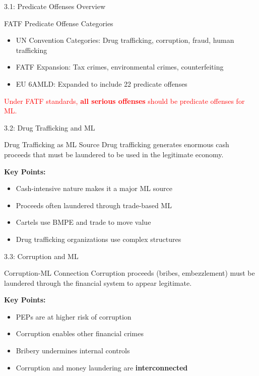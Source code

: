 \documentclass{beamer}
\begin{document}
	
	\begin{frame}{3.1: Predicate Offenses Overview}
		\begin{block}{FATF Predicate Offense Categories}
			\begin{itemize}
				\item UN Convention Categories: Drug trafficking, corruption, fraud, human trafficking
				\item FATF Expansion: Tax crimes, environmental crimes, counterfeiting
				\item EU 6AMLD: Expanded to include 22 predicate offenses
			\end{itemize}
		\end{block}
		\textcolor{red}{Under FATF standards, \textbf{all serious offenses} should be predicate offenses for ML.}
	\end{frame}
	
	\begin{frame}{3.2: Drug Trafficking and ML}
		\begin{block}{Drug Trafficking as ML Source}
			Drug trafficking generates enormous cash proceeds that must be laundered to be used in the legitimate economy.
		\end{block}
		\textbf{Key Points:}
		\begin{itemize}
			\item Cash-intensive nature makes it a major ML source
			\item Proceeds often laundered through trade-based ML
			\item Cartels use BMPE and trade to move value
			\item Drug trafficking organizations use complex structures
		\end{itemize}
	\end{frame}
	
	\begin{frame}{3.3: Corruption and ML}
		\begin{block}{Corruption-ML Connection}
			Corruption proceeds (bribes, embezzlement) must be laundered through the financial system to appear legitimate.
		\end{block}
		\textbf{Key Points:}
		\begin{itemize}
			\item PEPs are at higher risk of corruption
			\item Corruption enables other financial crimes
			\item Bribery undermines internal controls
			\item Corruption and money laundering are \textbf{interconnected}
		\end{itemize}
	\end{frame}
	
\end{document}
